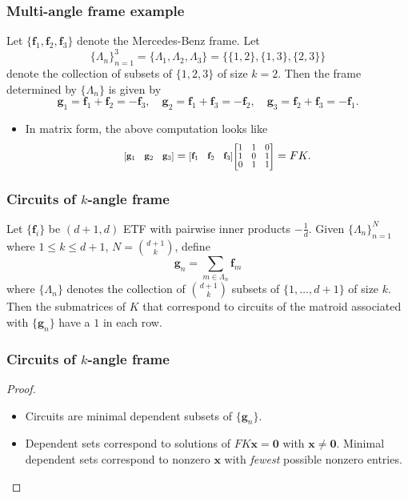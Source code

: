 \documentclass{beamer}
\renewcommand{\vec}[1]{\mathbf{#1}}
\newcommand{\ivec}[2][.8]{%
  \scalebox{#1}{%
    \renewcommand{\arraystretch}{.8}%
    $\begin{bmatrix}#2\end{bmatrix}$%
  }
}
\begin{document}
{\begin{frame}
    \frametitle{Multi-angle frame example}
    \begin{example}
        Let $\{\vec{f}_1, \vec{f}_2, \vec{f}_3\}$ denote the Mercedes-Benz frame.
        Let
        \[
        \{\Lambda_n\}_{n=1}^{3} = \{\Lambda_1, \Lambda_2, \Lambda_3\} = \{\{1, 2\}, \{1, 3\}, \{2, 3\}\}
        \]
        denote the collection of subsets of $\{1,2,3\}$ of size $k = 2$.
        Then the frame determined by $\{\Lambda_n\}$ is given by
        \[
        \vec{g}_1 = \vec{f}_1+\vec{f}_2 = -\vec{f}_3,\quad \vec{g}_2 = \vec{f}_1+\vec{f}_3 = -\vec{f}_2,\quad \vec{g}_3 = \vec{f}_2+\vec{f}_3 = -\vec{f}_1.
        \]
    \end{example}
    \begin{itemize}
    \item <2-> In matrix form, the above computation looks like
    \[
    \ivec{\vec{g}_1 & \vec{g}_2 & \vec{g}_3}
    = \ivec{\vec{f}_1 & \vec{f}_2 & \vec{f}_3}\ivec{1 & 1 & 0 \\ 1 & 0 & 1 \\ 0 & 1 & 1} = FK.
    \]
    \end{itemize}
\end{frame}

\begin{frame}
    \frametitle{Circuits of $k$-angle frame}
    \begin{theorem}
        Let $\{\vec{f}_i\}$ be $(d+1,d)$ ETF with pairwise inner products $-\frac{1}{d}$.
        Given $\{\Lambda_n\}_{n=1}^{N}$ where $1\leq k\leq d+1$, $N = \binom{d+1}{k}$, define
        \[
            \vec{g}_n = \sum_{m\in\Lambda_n}\vec{f}_m
        \]
        where $\{\Lambda_n\}$ denotes the collection of $\binom{d+1}{k}$ subsets of $\{1,\ldots, d+1\}$ of size $k$.
        Then the submatrices of $K$ that correspond to circuits of the matroid associated with $\{\vec{g}_n\}$ have a $1$ in each row.
    \end{theorem}
\end{frame}
\begin{frame}
    \frametitle{Circuits of $k$-angle frame}
    \begin{proof}
        \begin{itemize}
            \item <1-> Circuits are minimal dependent subsets of $\{\vec{g}_n\}$.

            \item <2-> Dependent sets correspond to solutions of $FK\vec{x} = \vec{0}$ with $\vec{x}\neq\vec{0}$.
            Minimal dependent sets correspond to nonzero $\vec{x}$ with \textit{fewest} possible nonzero entries.


\end{itemize}
\end{proof}
\end{frame}}
\end{document}

